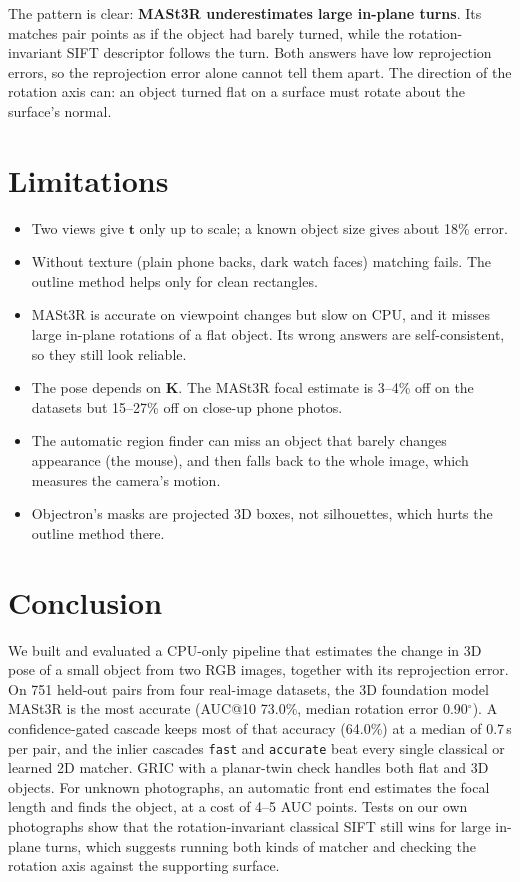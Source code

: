\documentclass[11pt,a4paper]{article}
\newcommand{\tv}{\mathbf{t}}
\newcommand{\K}{\mathbf{K}}
\begin{document}
The pattern is clear: \textbf{MASt3R underestimates large in-plane turns}. Its matches pair points as if
the object had barely turned, while the rotation-invariant SIFT descriptor follows the turn. Both
answers have low reprojection errors, so the reprojection error alone cannot tell them apart.
The direction of the rotation axis can: an object turned flat on a surface must rotate about the
surface's normal.

\section{Limitations}
\begin{itemize}
  \item Two views give $\tv$ only up to scale; a known object size gives about 18\% error.
  \item Without texture (plain phone backs, dark watch faces) matching fails. The outline method helps
        only for clean rectangles.
  \item MASt3R is accurate on viewpoint changes but slow on CPU, and it misses large in-plane rotations
        of a flat object. Its wrong answers are self-consistent, so they still look reliable.
  \item The pose depends on $\K$. The MASt3R focal estimate is 3--4\% off on the datasets but 15--27\%
        off on close-up phone photos.
  \item The automatic region finder can miss an object that barely changes appearance (the mouse), and
        then falls back to the whole image, which measures the camera's motion.
  \item Objectron's masks are projected 3D boxes, not silhouettes, which hurts the outline method there.
\end{itemize}

\section{Conclusion}
We built and evaluated a CPU-only pipeline that estimates the change in 3D pose of a small object
from two RGB images, together with its reprojection error. On 751 held-out pairs from four real-image
datasets, the 3D foundation model MASt3R is the most accurate (AUC@10 73.0\%, median rotation error
0.90$^\circ$). A confidence-gated cascade keeps most of that accuracy (64.0\%) at a median of 0.7\,s per pair,
and the inlier cascades \texttt{fast} and \texttt{accurate} beat every single classical or learned 2D matcher.
GRIC with a planar-twin check handles both flat and 3D objects. For unknown photographs, an automatic
front end estimates the focal length and finds the object, at a cost of 4--5 AUC points. Tests on our
own photographs show that the rotation-invariant classical SIFT still wins for large in-plane turns, which
suggests running both kinds of matcher and checking the rotation axis against the supporting surface.
\end{document}
